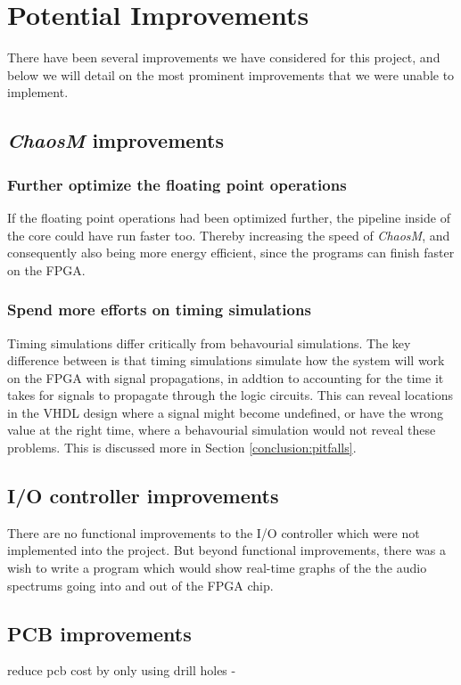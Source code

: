 \section{Potential Improvements}

There have been several improvements we have considered for this project, and
below we will detail on the most prominent improvements that we were unable to
implement.

\subsection{\textit{ChaosM} improvements}
\subsubsection{Further optimize the floating point operations}
If the floating point operations had been optimized further, the pipeline inside of the core could have run faster too.
Thereby increasing the speed of \textit{ChaosM}, and consequently also being more energy efficient, since the programs can finish faster on the FPGA.

\subsubsection{Spend more efforts on timing simulations}
Timing simulations differ critically from behavourial simulations.
The key difference between is that timing simulations simulate how the system will work on the FPGA with signal propagations,
in addtion to accounting for the time it takes for signals to propagate through the logic circuits.
This can reveal locations in the VHDL design where a signal might become undefined, or have the wrong value at the right time, where a behavourial simulation would not reveal these problems.
This is discussed more in Section \ref{conclusion:pitfalls}.

\subsection{I/O controller improvements}
There are no functional improvements to the I/O controller which were not implemented into the project.
But beyond functional improvements, there was a wish to write a program which would show
real-time graphs of the the audio spectrums going into and out of the FPGA chip.

\subsection{PCB improvements}
reduce pcb cost by only using drill holes -

